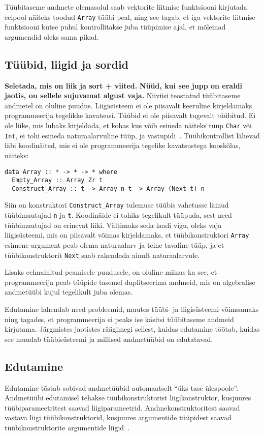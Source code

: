 \documentclass[12pt]{article}
\newcommand\markus[1]{\textcolor{roheline}{\textbf{#1}}}
\begin{document}
      Tüübitaseme andmete olemasolul saab vektorite liitmise funktsiooni kirjutada eelpool näiteks toodud \verb!Array! tüübi peal, ning see tagab, et iga vektorite liitmise funktsiooni kutse puhul kontrollitakse juba tüüpimise ajal, et mõlemad argumendid oleks sama pikad.
    \subsection{Tüübid, liigid ja sordid}
      \markus{Seletada, mis on liik ja sort + viited.} \markus{Nüüd, kui see jupp on eraldi jaotis, on sellele sujuvamat algust vaja.} Niiviisi teostatud tüübitaseme andmetel on oluline puudus. Liigisüsteem ei ole piisavalt keeruline kirjeldamaks programmeerija tegelikke kavatsusi. Tüübid ei ole piisavalt tugevalt tüübitud. Ei ole liike, mis lubaks kirjeldada, et kohas kus võib esineda näiteks tüüp \verb!Char! või \verb!Int!, ei tohi esineda naturaalarvuline tüüp, ja vastupidi~\cite{Giv}. Tüübikontrollist lähevad läbi koodinäited, mis ei ole programmeerija tegelike kavatsustega kooskõlas, näiteks:

      \begin{verbatim}data Array :: * -> * -> * where
  Empty_Array :: Array Zr t
  Construct_Array :: t -> Array n t -> Array (Next t) n\end{verbatim}

      Siin on konstruktori \verb!Construct_Array! tulemuse tüübis vahetusse läinud tüübimuutujad \verb!n! ja \verb!t!. Koodinäide ei tohiks tegelikult tüüpuda, sest need tüübimuutujad on erinevat liiki. Vältimaks seda laadi vigu, oleks vaja liigisüsteemi, mis on piisavalt võimas kirjeldamaks, et tüübikonstruktori \verb!Array! esimene argument peab olema naturaalarv ja teine tavaline tüüp, ja et tüübikonstruktorit \verb!Next! saab rakendada ainult naturaalarvule.

      Lisaks eelmainitud peamisele puudusele, on oluline miinus ka see, et programmeerija peab tüüpide tasemel duplitseerima andmeid, mis on algebralise andmetüübi kujul tegelikult juba olemas.

      Edutamine lahendab need probleemid, muutes tüübi- ja liigisüsteemi võimsamaks ning tagades, et programmeerija ei peaks ise käsitsi tüübitaseme andmeid kirjutama. Järgmistes jaotistes räägimegi sellest, kuidas edutamine töötab, kuidas see muudab tüübisüsteemi ja millised andmetüübid on edutatavad.
    \subsection{Edutamine}
      Edutamine tõstab sobivad andmetüübid automaatselt "`üks tase ülespoole"'. Andmetüübi edutamisel tehakse tüübikonstruktorist liigikonstruktor, kusjuures tüübiparameetritest saavad liigiparameetrid. Andmekonstruktoritest saavad vastava liigi tüübikonstruktorid, kusjuures argumentide tüüpidest saavad tüübikonstruktorite argumentide liigid~\cite{Giv}.
\end{document}

